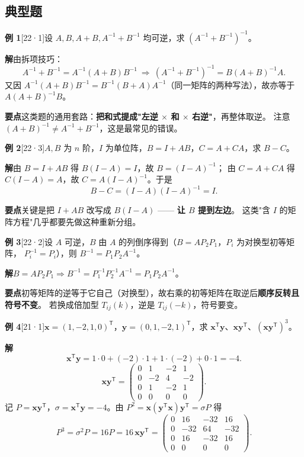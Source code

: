 \documentclass[10pt]{ctexart}
\newcommand{\TT}{^{\mathsf T}}
\newcommand{\bv}[1]{\begin{pmatrix}#1\end{pmatrix}}
\newcommand{\y}[1]{\textcolor{y21}{[21·#1]}}
\newcommand{\yii}[1]{\textcolor{y22}{[22·#1]}}
\begin{document}
\subsection{典型题}

\textbf{例 1}\yii{1}\quad 设 $A,B,A+B,A^{-1}+B^{-1}$ 均可逆，求 $(A^{-1}+B^{-1})^{-1}$。

\textbf{解}\quad 由拆项技巧：
\[
A^{-1}+B^{-1}=A^{-1}(A+B)B^{-1}
\ \Longrightarrow\
(A^{-1}+B^{-1})^{-1}=B(A+B)^{-1}A .
\]
又因 $A^{-1}(A+B)B^{-1}=B^{-1}(B+A)A^{-1}$（同一矩阵的两种写法），故亦等于 $A(A+B)^{-1}B$。

\begin{tipbox}
\textbf{要点}\quad 这类题的通用套路：\textbf{把和式提成"左逆 $\times$ 和 $\times$ 右逆"}，再整体取逆。
注意 $(A+B)^{-1}\neq A^{-1}+B^{-1}$，这是最常见的错误。
\end{tipbox}

\medskip
\textbf{例 2}\yii{3}\quad $A,B$ 为 $n$ 阶，$I$ 为单位阵，$B=I+AB$，$C=A+CA$，求 $B-C$。

\textbf{解}\quad 由 $B=I+AB$ 得 $B(I-A)=I$，故 $B=(I-A)^{-1}$；
由 $C=A+CA$ 得 $C(I-A)=A$，故 $C=A(I-A)^{-1}$。于是
\[
B-C=(I-A)(I-A)^{-1}=I .
\]

\begin{tipbox}
\textbf{要点}\quad 关键是把 $I+AB$ 改写成 $B(I-A)$ —— \textbf{让 $B$ 提到左边}。
这类"含 $I$ 的矩阵方程"几乎都要先做这种重新分组。
\end{tipbox}

\medskip
\textbf{例 3}\yii{2}\quad 设 $A$ 可逆，$B$ 由 $A$ 的列倒序得到（$B=AP_2P_1$，$P_i$ 为对换型初等矩阵，
$P_i^{-1}=P_i$），则 $B^{-1}=P_1P_2A^{-1}$。

\textbf{解}\quad $B=AP_2P_1\Rightarrow B^{-1}=P_1^{-1}P_2^{-1}A^{-1}=P_1P_2A^{-1}$。

\begin{tipbox}
\textbf{要点}\quad 初等矩阵的逆等于它自己（对换型），故右乘的初等矩阵在取逆后\textbf{顺序反转且符号不变}。
若换成倍加型 $T_{ij}(k)$，逆是 $T_{ij}(-k)$，符号要变。
\end{tipbox}

\medskip
\textbf{例 4}\y{1}\quad $\mathbf x=(1,-2,1,0)\TT$，$\mathbf y=(0,1,-2,1)\TT$，求 $\mathbf x\TT\mathbf y$、$\mathbf x\mathbf y\TT$、$(\mathbf x\mathbf y\TT)^3$。

\textbf{解}\quad
\[
\mathbf x\TT\mathbf y=1\cdot0+(-2)\cdot1+1\cdot(-2)+0\cdot1=-4 .
\]
\[
\mathbf x\mathbf y\TT=\bv{0&1&-2&1\\0&-2&4&-2\\0&1&-2&1\\0&0&0&0}.
\]
记 $P=\mathbf x\mathbf y\TT$，$\sigma=\mathbf x\TT\mathbf y=-4$。由 $P^2=\mathbf x(\mathbf y\TT\mathbf x)\mathbf y\TT=\sigma P$ 得
\[
P^3=\sigma^2P=16P=16\,\mathbf x\mathbf y\TT=\bv{0&16&-32&16\\0&-32&64&-32\\0&16&-32&16\\0&0&0&0}.
\]
\end{document}
